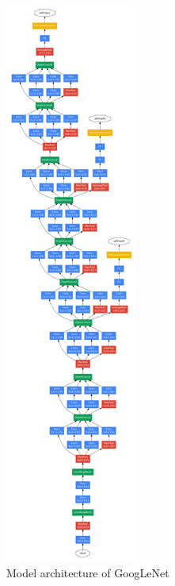 \newpage
{}

\begin{figure}[htbp]
\centering
\includegraphics[height=18.5cm]{includes/GoogLeNet}
\caption[Model architecture of GoogLeNet]{Model architecture of GoogLeNet \citep[p. 7]{Szegedy2014}}
\label{fig:GoogLeNet}
\end{figure}
\newpage



